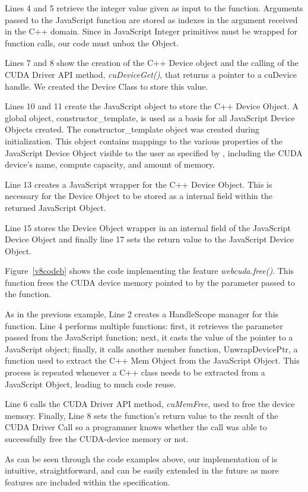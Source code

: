 Lines 4 and 5 retrieve the integer value given as
input to the function. Arguments passed to the JavaScript function are stored
as indexes in the argument received in the C++ domain. Since in JavaScript
Integer primitives must be wrapped for function calls, our code must unbox the
Object.

Lines 7 and 8 show the creation of the C++ Device object and the calling of the
CUDA Driver API method, \textit{cuDeviceGet()}, that returns a pointer to a
cuDevice handle. We created the Device Class to store this value.

Lines 10 and 11 create the JavaScript object to store the C++ Device Object. A
global object, constructor\_template, is used as a basis for all JavaScript Device
Objects created. The constructor\_template object was created during
initialization. This object contains mappings to the various properties of the
JavaScript Device Object visible to the user as specified by \namens, including the
CUDA device's name, compute capacity, and amount of memory.

Line 13 creates a JavaScript wrapper for the C++ Device Object. This is
necessary for the Device Object to be stored as a internal field within the
returned JavaScript Object.

Line 15 stores the Device Object wrapper in an internal field of the JavaScript
Device Object and finally line 17 sets the return value to the JavaScript Device
Object.


Figure~\ref{v8codeb} shows the code implementing the \name feature
\textit{webcuda.free()}. This function frees the CUDA device memory pointed to by
the parameter passed to the function. 

As in the previous example, Line 2 creates a HandleScope manager for this
function.  Line 4 performs multiple functions: first, it retrieves the parameter
passed from the JavaScript function; next, it casts the value of the pointer to
a JavaScript object; finally, it calls another member function, UnwrapDevicePtr, a
function used to extract the C++ Mem Object from the JavaScript Object. This
process is repeated whenever a C++ class needs to be extracted from a JavaScript
Object, leading to much code reuse.

Line 6 calls the CUDA Driver API method, \textit{cuMemFree}, used to free the
device memory. Finally, Line 8 sets the function's return value to the result of
the CUDA Driver Call so a programmer knows whether the call was able to
successfully free the CUDA-device memory or not.


As can be seen through the code examples above, our implementation of \name is intuitive,
straightforward, and can be easily extended in the future as more features are
included within the \name specification.


